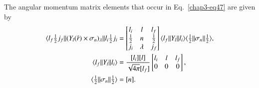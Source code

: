 The angular momentum matrix elements that occur in Eq.\ \eqref{chap3-eq47} are given by
\begin{align}
  \langle l_f \tfrac{1}{2} j_f || (Y_l ({\boldmath \hat{r}}) \times \sigma_n)_\lambda || l_i \tfrac{1}{2} j_i
  & = \begin{bmatrix} l_i & l & l_f\\ \tfrac{1}{2} & n & \tfrac{1}{2}\\ j_i & \lambda & j_f \end{bmatrix}
  \langle l_f || Y_l || l_i \rangle \langle\tfrac{1}{2} || \sigma_n || \tfrac{1}{2} \rangle, \label{chap3-eq48}\\
  \langle l_f || Y_l || l_i \rangle & = \frac{[l_i][l]}{\sqrt{4 \pi}[l_f]} \begin{bmatrix} l_i &l & l_f\\ 0 & 0 & 0 \end{bmatrix}, \label{chap3-eq49}\\
  \langle \tfrac{1}{2} || \sigma_n || \tfrac{1}{2} \rangle & = [n]. \label{chap3-eq50}
\end{align}


